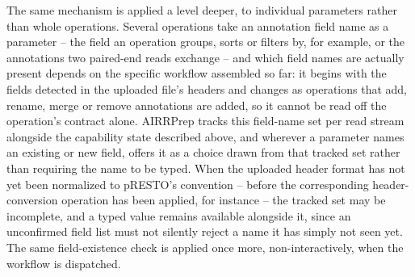\documentclass[11pt]{article}
\begin{document}
The same mechanism is applied a level deeper, to individual parameters rather
than whole operations. Several operations take an annotation field name as a
parameter -- the field an operation groups, sorts or filters by, for example,
or the annotations two paired-end reads exchange -- and which field names are
actually present depends on the specific workflow assembled so far: it begins
with the fields detected in the uploaded file's headers and changes as
operations that add, rename, merge or remove annotations are added, so it
cannot be read off the operation's contract alone. AIRRPrep tracks this
field-name set per read stream alongside the capability state described
above, and wherever a parameter names an existing or new field, offers it as
a choice drawn from that tracked set rather than requiring the name to be
typed. When
the uploaded header format has not yet been normalized to pRESTO's convention
-- before the corresponding header-conversion operation has been applied, for
instance -- the tracked set may be incomplete, and a typed value remains
available alongside it, since an unconfirmed field list must not silently
reject a name it has simply not seen yet. The same field-existence check is
applied once more, non-interactively, when the workflow is dispatched.
\end{document}
